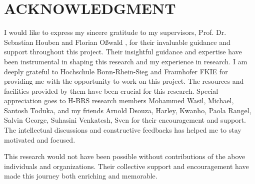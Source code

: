 \documentclass[../report.tex]{subfiles}
\begin{document}
    \section*{ACKNOWLEDGMENT}

    I would like to express my sincere gratitude to my supervisors, Prof. Dr. Sebastian Houben and Florian Oßwald , for their invaluable guidance
    and support throughout this project. Their insightful guidance and expertise have been instrumental in shaping this research and my experience in research. 
    I am deeply grateful to Hochschule Bonn-Rhein-Sieg and Fraunhofer FKIE for providing me with the opportunity to work on this project. The resources and facilities
    provided by them have been crucial for this research. Special appreciation goes to H-BRS research members Mohammed Wasil, Michael, Santosh Toduka, and my friends Arnold Dsouza, Harley, Kwanho, Paola Rangel, Salvin George, Suhasini Venkatesh, Sven  for their encouragement and support. The intellectual
    discussions and constructive feedbacks has helped me to stay motivated and focused. 
    
    
    This research would not have been possible without contributions of the above individuals and organizations. Their collective support and encouragement have made
    this journey both enriching and memorable.
\end{document}
